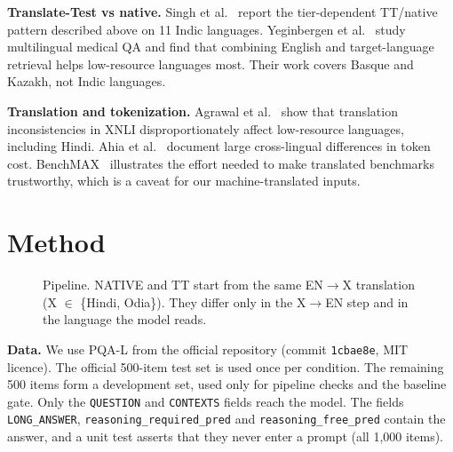\documentclass[acmsmall,nonacm]{acmart}
\begin{document}
\textbf{Translate-Test vs native.} Singh et al.~\cite{singh2025indicqa} report the tier-dependent TT/native pattern described above on 11 Indic languages. Yeginbergen et al.~\cite{yeginbergen2026crosslingual} study multilingual medical QA and find that combining English and target-language retrieval helps low-resource languages most. Their work covers Basque and Kazakh, not Indic languages.

\textbf{Translation and tokenization.} Agrawal et al.~\cite{agrawal2024translation} show that translation inconsistencies in XNLI disproportionately affect low-resource languages, including Hindi. Ahia et al.~\cite{ahia2023tokens} document large cross-lingual differences in token cost. BenchMAX~\cite{huang2025benchmax} illustrates the effort needed to make translated benchmarks trustworthy, which is a caveat for our machine-translated inputs.

\section{Method}

\begin{figure}[t]
\centering
{}
\caption{Pipeline. NATIVE and TT start from the same EN$\to$X translation (X $\in$ \{Hindi, Odia\}). They differ only in the X$\to$EN step and in the language the model reads.}
\label{fig:pipeline}
\end{figure}

\textbf{Data.} We use PQA-L from the official repository (commit \texttt{1cbae8e}, MIT licence). The official 500-item test set is used once per condition. The remaining 500 items form a development set, used only for pipeline checks and the baseline gate. Only the \texttt{QUESTION} and \texttt{CONTEXTS} fields reach the model. The fields \texttt{LONG\_ANSWER}, \texttt{reasoning\_required\_pred} and \texttt{reasoning\_free\_pred} contain the answer, and a unit test asserts that they never enter a prompt (all 1,000 items).
\end{document}
